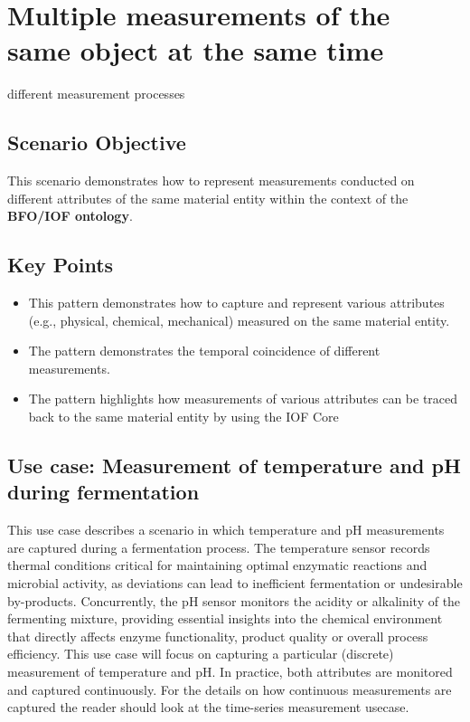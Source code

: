 

\section{Multiple measurements of the same object at the same time}
different measurement processes 

\subsection*{Scenario Objective}

This scenario demonstrates how to represent measurements conducted on different attributes of the same material entity within the context of the \textbf{BFO/IOF ontology}.

\subsection*{Key Points}
\begin{itemize}
    \item This pattern demonstrates how to capture and represent various attributes (e.g., physical, chemical, mechanical) measured on the same material entity.
    \item The pattern demonstrates the temporal coincidence of different measurements.
     \item The pattern highlights how measurements of various attributes can be traced back to the same material entity by using the IOF Core
\end{itemize}
\subsection{Use case: Measurement of temperature and pH during fermentation}
This use case describes a scenario in which temperature and pH measurements are captured during a fermentation process. The temperature sensor records thermal conditions critical for maintaining optimal enzymatic reactions and microbial activity, as deviations can lead to inefficient fermentation or undesirable by-products. Concurrently, the pH sensor monitors the acidity or alkalinity of the fermenting mixture, providing essential insights into the chemical environment that directly affects enzyme functionality, product quality or overall process efficiency.
This use case will focus on capturing a particular (discrete) measurement of temperature and pH. In practice, both attributes are monitored and captured continuously. For the details on how continuous measurements are captured the reader should look at the time-series measurement usecase.

